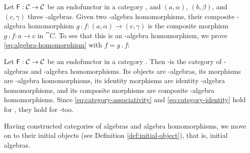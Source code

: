 \begin{definition}
  \label{def:composite-algebra-homomorphism}

  Let $\mathsf{F}: \mathcal{C} \to \mathcal{C}$ be an endofunctor in a category
  , and $(a,\alpha)$, $(b,\beta)$, and $(c,\gamma)$ three
  -algebras. Given two -algebra homomorphisms, their
  composite -algebra homomorphism $g \comp f: (a,\alpha) \to
  (c,\gamma)$ is the composite morphism $g \comp f: a \to c$ in
  $\cat{C}$. To see that this is an -algebra homomorphism, we
  prove \eqref{eq:algebra-homomorphism} with $f = g \comp f$:
  \begin{steps}
      \eqby{\eqref{eq:functor-composition}}
      \eqby{\eqref{eq:algebra-homomorphism}}
  \end{steps}

\end{definition}

\begin{definition}
  \label{def:category-alg}


  Let $\mathsf{F}: \mathcal{C} \to \mathcal{C}$ be an endofunctor in a category
  . Then -\alg is the category of -algebras and
  -algebra homomorphisms. Its objects are -algebras,
  its morphisms are -algebra homomorphisms, its identity
  morphisms are identity -algebra homomorphisms, and its
  composite morphisms are composite -algebra homomorphisms.
  Since \eqref{eq:category-associativity} and
  \eqref{eq:category-identity} hold for , they hold for
  -\alg too.

\end{definition}

Having constructed categories of algebras and algebra homomorphisms,
we move on to their initial objects (see Definition
\ref{def:initial-object}), that is, initial algebras.

